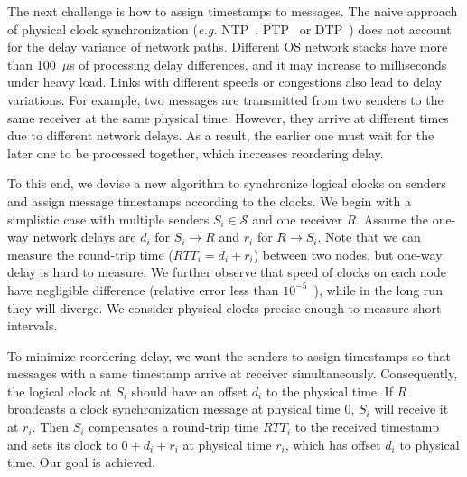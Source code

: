 
The next challenge is how to assign timestamps to messages.
The naive approach of physical clock synchronization (\textit{e.g.} NTP~\cite{mills1991internet}, PTP~\cite{correll2005design} or DTP~\cite{lee2016globally}) does not account for the delay variance of network paths.
Different OS network stacks have more than 100~$\mu$s of processing delay differences, and it may increase to milliseconds under heavy load.
Links with different speeds or congestions also lead to delay variations.
For example, two messages are transmitted from two senders to the same receiver at the same physical time. However, they arrive at different times due to different network delays. As a result, the earlier one must wait for the later one to be processed together, which increases reordering delay.

To this end, we devise a new algorithm to synchronize logical clocks on senders and assign message timestamps according to the clocks. We begin with a simplistic case with multiple senders $S_i \in \mathcal{S}$ and one receiver $R$. Assume the one-way network delays are $d_i$ for $S_i \rightarrow R$ and $r_i$ for $R \rightarrow S_i$. Note that we can measure the round-trip time ($RTT_i = d_i + r_i$) between two nodes, but one-way delay is hard to measure. We further observe that speed of clocks on each node have negligible difference (relative error less than $10^{-5}$~\cite{corbett2013spanner}), while in the long run they will diverge. We consider physical clocks precise enough to measure short intervals.

To minimize reordering delay, we want the senders to assign timestamps so that messages with a same timestamp arrive at receiver simultaneously. Consequently, the logical clock at $S_i$ should have an offset $d_i$ to the physical time. If $R$ broadcasts a clock synchronization message at physical time 0, $S_i$ will receive it at $r_i$. Then $S_i$ compensates a round-trip time $RTT_i$ to the received timestamp and sets its clock to $0 + d_i + r_i$ at physical time $r_i$, which has offset $d_i$ to physical time. Our goal is achieved.


